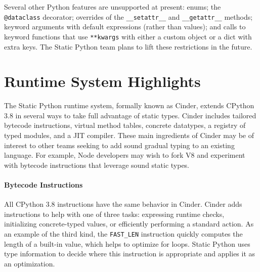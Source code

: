 \documentclass[english,cleveref,submission]{programming}
\newcommand{\SP}{Static Python}
\newcommand{\code}[1]{\texttt{#1}}
\begin{document}
Several other Python features are unsupported at present:
enums; the \code{@dataclass} decorator;
overrides of the \code{\_\_setattr\_\_} and \code{\_\_getattr\_\_} methods;
keyword arguments with default expressions (rather than values); and
calls to keyword functions that use \code{**kwargs} with either
a custom object or a dict with extra keys.
The \SP{} team plans to lift these restrictions in the future.


\section{Runtime System Highlights}
\label{s:runtime}


The \SP{} runtime system, formally known as Cinder, extends
CPython 3.8 in several ways to take full advantage of static types.
Cinder includes tailored bytecode instructions, virtual method tables,
concrete datatypes, a registry of typed modules, and a JIT compiler.
These main ingredients of Cinder may be of interest to other teams seeking to
add sound gradual typing to an existing language.
For example, Node developers may wish to fork V8 and experiment with
bytecode instructions that leverage sound static types.


\paragraph{Bytecode Instructions}

All CPython 3.8 instructions have the same behavior in Cinder.
Cinder adds instructions to help with one of three tasks:
expressing runtime checks,
initializing concrete-typed values,
or efficiently performing a standard action.
As an example of the third kind, the \code{FAST\_LEN} instruction quickly
computes the length of a built-in value, which helps to optimize for loops.
\SP{} uses type information to decide where this instruction is appropriate
and applies it as an optimization.
\end{document}
